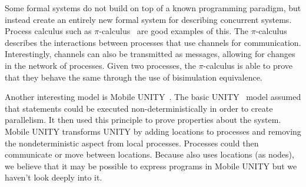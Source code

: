 Some formal systems do not build on top of a known programming paradigm, but instead
create an entirely new formal system for describing concurrent systems. Process calculus
such as $\pi$-calculus~\cite{Milner:1999:CMS:329902} are good examples of this.
The $\pi$-calculus describes the interactions between processes
that use channels for communication. Interestingly, channels can also be transmitted as
messages, allowing for changes in the network of processes.
Given two processes, the $\pi$-calculus is able to prove that they behave the same through
the use of bisimulation equivalence.

Another interesting model is Mobile UNITY~\cite{Roman97anintroduction}. The basic UNITY~\cite{UNITY} model assumed that statements could be executed non-deterministically
in order to create parallelism. It then used this principle to prove properties about
the system.
Mobile UNITY transforms UNITY by adding locations to processes and removing the
nondeterministic aspect from local processes. Processes could then communicate or move
between locations. Because \lang also uses locations (as nodes),
we believe that it may be possible to express \lang programs in Mobile UNITY but
we haven't look deeply into it.
